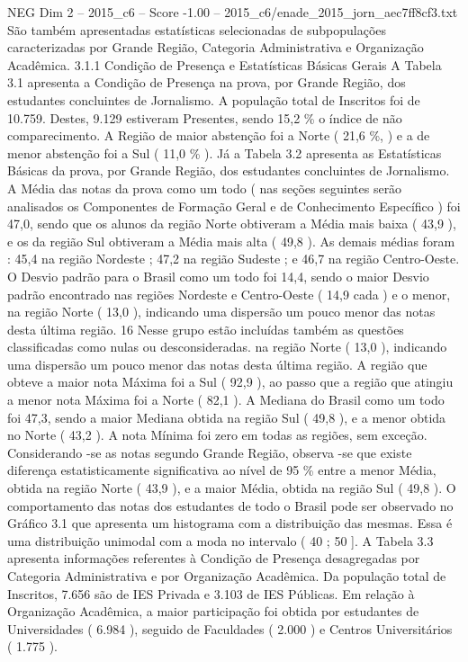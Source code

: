 \begin{textsample}{NEG Dim 2 – 2015\_c6 – Score -1.00 – 2015\_c6/enade\_2015\_jorn\_aec7ff8cf3.txt}
São também apresentadas estatísticas selecionadas de subpopulações caracterizadas por Grande Região, Categoria Administrativa e Organização Acadêmica. 3.1.1 Condição de Presença e Estatísticas Básicas Gerais A Tabela 3.1 apresenta a Condição de Presença na prova, por Grande Região, dos estudantes concluintes de Jornalismo.
A população total de Inscritos foi de 10.759.
Destes, 9.129 estiveram Presentes, sendo 15,2 \% o índice de não comparecimento.
A Região de maior abstenção foi a Norte ( 21,6 \%, ) e a de menor abstenção foi a Sul ( 11,0 \% ).
Já a Tabela 3.2 apresenta as Estatísticas Básicas da prova, por Grande Região, dos estudantes concluintes de Jornalismo.
A Média das notas da prova como um todo ( nas seções seguintes serão analisados os Componentes de Formação Geral e de Conhecimento Específico ) foi 47,0, sendo que os alunos da região Norte obtiveram a Média mais baixa ( 43,9 ), e os da região Sul obtiveram a Média mais alta ( 49,8 ).
As demais médias foram : 45,4 na região Nordeste ; 47,2 na região Sudeste ; e 46,7 na região Centro-Oeste.
O Desvio padrão para o Brasil como um todo foi 14,4, sendo o maior Desvio padrão encontrado nas regiões Nordeste e Centro-Oeste ( 14,9 cada ) e o menor, na região Norte ( 13,0 ), indicando uma dispersão um pouco menor das notas desta última região. 16 Nesse grupo estão incluídas também as questões classificadas como nulas ou desconsideradas. na região Norte ( 13,0 ), indicando uma dispersão um pouco menor das notas desta última região.
A região que obteve a maior nota Máxima foi a Sul ( 92,9 ), ao passo que a região que atingiu a menor nota Máxima foi a Norte ( 82,1 ).
A Mediana do Brasil como um todo foi 47,3, sendo a maior Mediana obtida na região Sul ( 49,8 ), e a menor obtida no Norte ( 43,2 ).
A nota Mínima foi zero em todas as regiões, sem exceção.
Considerando -se as notas segundo Grande Região, observa -se que existe diferença estatisticamente significativa ao nível de 95 \% entre a menor Média, obtida na região Norte ( 43,9 ), e a maior Média, obtida na região Sul ( 49,8 ).
O comportamento das notas dos estudantes de todo o Brasil pode ser observado no Gráfico 3.1 que apresenta um histograma com a distribuição das mesmas.
Essa é uma distribuição unimodal com a moda no intervalo ( 40 ; 50 ].
A Tabela 3.3 apresenta informações referentes à Condição de Presença desagregadas por Categoria Administrativa e por Organização Acadêmica.
Da população total de Inscritos, 7.656 são de IES Privada e 3.103 de IES Públicas.
Em relação à Organização Acadêmica, a maior participação foi obtida por estudantes de Universidades ( 6.984 ), seguido de Faculdades ( 2.000 ) e Centros Universitários ( 1.775 ).

\end{textsample}
